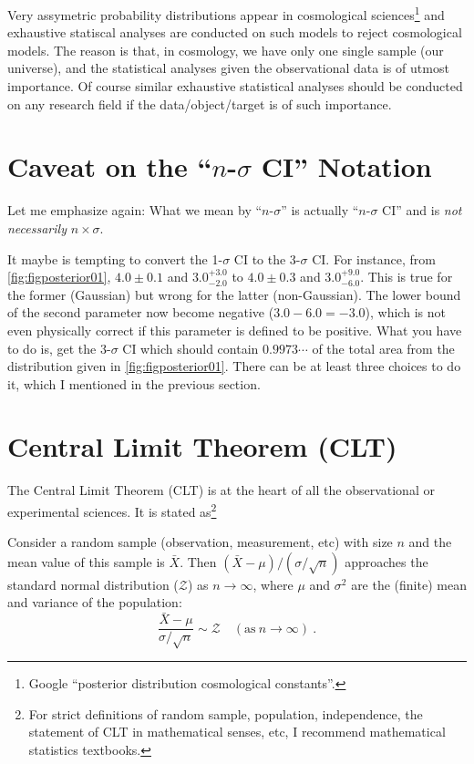 Very assymetric probability distributions appear in cosmological sciences\footnote{Google ``posterior distribution cosmological constants''.} and exhaustive statiscal analyses are conducted on such models to reject cosmological models. The reason is that, in cosmology, we have only one single sample (our universe), and the statistical analyses given the observational data is of utmost importance. Of course similar exhaustive statistical analyses should be conducted on any research field if the data/object/target is of such importance. 



\section{Caveat on the ``$ n $-$ \sigma $ CI'' Notation}
Let me emphasize again: What we mean by ``$ n $-$ \sigma $'' is actually ``$ n $-$ \sigma $ CI'' and is \textit{not necessarily} $ n \times \sigma $. 

It maybe is tempting to convert the 1-$ \sigma $ CI to the 3-$ \sigma $ CI. For instance, from \cref{fig:figposterior01}, $ 4.0 \pm 0.1 $ and $ 3.0^{+3.0}_{-2.0} $ to $ 4.0 \pm 0.3 $ and $ 3.0^{+9.0}_{-6.0} $. This is true for the former (Gaussian) but wrong for the latter (non-Gaussian). The lower bound of the second parameter now become negative ($ 3.0 - 6.0 = -3.0 $), which is not even physically correct if this parameter is defined to be positive. What you have to do is, get the 3-$ \sigma $ CI which should contain $ 0.9973\cdots $ of the total area from the distribution given in \cref{fig:figposterior01}. There can be at least three choices to do it, which I mentioned in the previous section.


\section{Central Limit Theorem (CLT)}
The Central Limit Theorem (CLT) is at the heart of all the observational or experimental sciences. It is stated as\footnote{For strict definitions of random sample, population, independence, the statement of CLT in mathematical senses, etc, I recommend mathematical statistics textbooks.}

\begin{thm} \label{thm: clt}
  Consider a random sample (observation, measurement, etc) with size $ n $ and the mean value of this sample is $ \bar{X} $. Then $ (\bar{X} - \mu) / (\sigma / \sqrt{n}) $ approaches the standard normal distribution ($ \mathcal{Z} $) as $ n \rightarrow \infty $, where $ \mu $ and $ \sigma^2 $ are the (finite) mean and variance of the population:
  \begin{equation}
    \frac{\bar{X} - \mu}{\sigma / \sqrt{n}} \sim \mathcal{Z}  \quad (\mathrm{as~} n \rightarrow \infty)~.
  \end{equation}
\end{thm}

